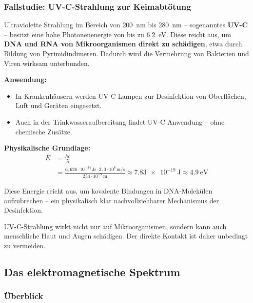\subsubsection{Fallstudie: UV-C-Strahlung zur Keimabtötung}

Ultraviolette Strahlung im Bereich von \SI{200}{nm} bis \SI{280}{nm} – sogenanntes \textbf{UV-C} – besitzt eine hohe Photonenenergie von bis zu \SI{6.2}{\electronvolt}. Diese reicht aus, um \textbf{DNA und RNA von Mikroorganismen direkt zu schädigen}, etwa durch Bildung von Pyrimidindimeren. Dadurch wird die Vermehrung von Bakterien und Viren wirksam unterbunden.

\textbf{Anwendung:}
\begin{itemize}
	\item In Krankenhäusern werden UV-C-Lampen zur Desinfektion von Oberflächen, Luft und Geräten eingesetzt.
	\item Auch in der Trinkwasseraufbereitung findet UV-C Anwendung – ohne chemische Zusätze.
\end{itemize}

\textbf{Physikalische Grundlage:}
\[
\begin{aligned}
	E &= \frac{hc}{\lambda} \\[0.3em]
	&= \frac{6{,}626 \cdot 10^{-34}\,\si{\joule\second}
		\cdot 3{,}0 \cdot 10^{8}\,\si{\meter\per\second}}
	{254 \cdot 10^{-9}\,\si{\meter}}
	\approx \SI{7.83e-19}{\joule}\!\approx\!\SI{4.9}{\electronvolt}
\end{aligned}
\]



Diese Energie reicht aus, um kovalente Bindungen in DNA-Molekülen aufzubrechen – ein physikalisch klar nachvollziehbarer Mechanismus der Desinfektion.
\vspace{0.5em}
\begin{tcolorbox}[physikbox, title=Hinweis zur Gefährdung]
	\label{box:Hinweis zur Gefärdung}
	UV-C-Strahlung wirkt nicht nur auf Mikroorganismen, sondern kann auch menschliche Haut und Augen schädigen. Der direkte Kontakt ist daher unbedingt zu vermeiden.
\end{tcolorbox}

\subsection{Das elektromagnetische Spektrum}

\subsubsection{Überblick}

